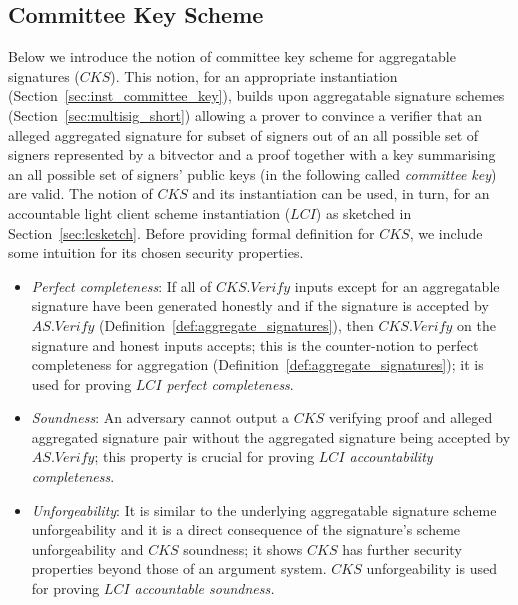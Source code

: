\subsection{Committee Key Scheme}
\label{sec:committee_key}

Below we introduce the notion of committee key scheme for aggregatable signatures ($\mathit{CKS}$). 
This notion, for an appropriate instantiation (Section~\ref{sec:inst_committee_key}),  
builds upon aggregatable signature schemes (Section~\ref{sec:multisig_short}) allowing a prover to convince a verifier that an alleged aggregated signature 
for subset of signers out of an all possible set of signers represented by a bitvector and a proof together with a key summarising an all possible set of signers' 
public keys (in the following called \emph{committee key}) are valid. The notion of $\mathit{CKS}$ and its instantiation can be used, in turn, for an accountable 
light client scheme instantiation ($\mathit{LCI}$) as sketched in Section~\ref{sec:lcsketch}. Before providing formal definition for $\mathit{CKS}$, 
we include some intuition for its chosen security properties.  

\begin{itemize}
\item \emph{Perfect completeness}: If all of $\mathit{CKS.Verify}$ inputs except for an aggregatable signature have been generated honestly and if the signature is accepted 
by $\mathit{AS.Verify}$ (Definition~\ref{def:aggregate_signatures}), then $\mathit{CKS.Verify}$ on the signature and honest inputs accepts; this is the counter-notion to perfect completeness for aggregation 
(Definition~\ref{def:aggregate_signatures}); it is used for proving \emph{$\mathit{LCI}$ perfect completeness}. 
\item \emph{Soundness}: An adversary cannot output a $\mathit{CKS}$ verifying proof and alleged aggregated signature pair without the aggregated signature being accepted 
by $\mathit{AS.Verify}$; this property is crucial for proving \emph{$\mathit{LCI}$ accountability completeness}. 
\item \emph{Unforgeability}: It is similar to the underlying aggregatable signature scheme unforgeability 
and it is a direct consequence of the signature's scheme unforgeability and $\mathit{CKS}$ soundness; 
it shows $\mathit{CKS}$ has further security properties beyond those of an argument system. $\mathit{CKS}$ unforgeability 
is used for proving \emph{$\mathit{LCI}$ accountable soundness.}
\end{itemize}

